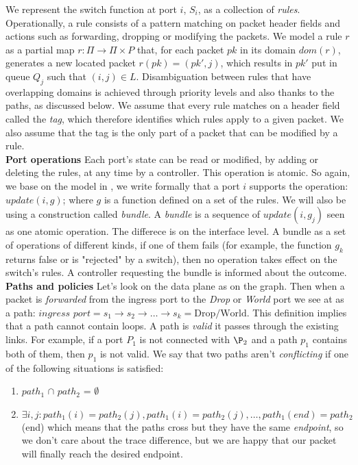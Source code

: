 \documentclass{article}
\theoremstyle{remark}
\begin{document}
We represent the switch function at port $i$, $S_i$, as a collection of \emph{rules}. Operationally, a rule consists of a pattern matching on packet header fields and actions such as forwarding, dropping or modifying the packets. We model a rule $r$ as a partial map $r:\Pi\rightarrow \Pi\times P$ that, for each packet $pk$ in its domain $\textit{dom}(r)$, generates a new located packet $r(pk)=(pk',j)$, which results in $pk'$ put in queue $Q_j$ such that $(i,j)\in L$. Disambiguation between rules that have overlapping domains is achieved through priority levels and also thanks to the paths, as discussed below. We assume that every rule matches on a header field called the \emph{tag}, which therefore identifies which rules apply to a given packet. We also assume that the tag is the only part of a packet that can be modified by a rule.\\
\textbf{Port operations} Each port's state can be read or modified, by adding or deleting the rules, at any time by a controller. This operation is atomic. So again, we base on the model in \cite{CKLS15}, we write formally that a port $i$ supports the operation: $update(i,g)$; where $g$ is a function defined on a set of the rules.
 We will also be using a construction called \emph{bundle}. A \emph{bundle} is a sequence of $update(i,g_j)$ seen as one atomic operation. The differece is on the interface level. A bundle as a set of operations of different kinds, if one of them fails (for example, the function $g_k$ returns false or is "rejected" by a switch), then no operation takes effect on the switch's rules. A controller requesting the bundle is informed about the outcome.\\
\textbf{Paths and policies}
Let's look on the data plane as on the graph. Then when a packet is \emph{forwarded} from the ingress port to the \emph{Drop} or \emph{World} port we see at as a path: $\textit{ingress port} = s_1\rightarrow s_2 \rightarrow\ldots\rightarrow s_k = \text{Drop/World.}$ This definition implies that a path cannot contain loops. A path is \emph{valid} it passes through the existing links. For example, if a port $P_1$ is not connected with $\P_2$ and a path $p_1$ contains both of them, then $p_1$ is not valid. 
We say that two paths aren't \emph{conflicting} if one of the following situations is satisfied:
    \begin{enumerate}
    \item \emph{$path_1$} $\cap$ \emph{$path_2$} = $\emptyset$
    \item $\exists i,j:path_1(i) = path_2(j), path_1(i) = path_2(j),\ldots, path_1(end)=path_2$(end) which means that the paths cross but they have the same \emph{endpoint}, so we don't care about the trace difference, but we are happy that our packet will finally reach the desired endpoint.
    \end{enumerate}
\end{document}
